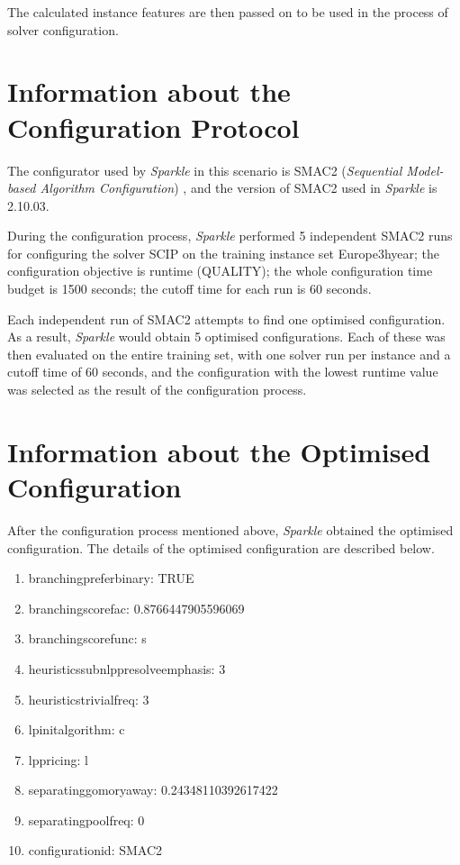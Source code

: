 \documentclass[british]{article}
\newif\iffeatures
\begin{document}
        The calculated instance features are then passed on to be used in the process of solver configuration. 

\fi


\section{Information about the Configuration Protocol}

The configurator used by \emph{Sparkle} in this scenario is SMAC2 ({\em Sequential Model-based Algorithm Configuration}) \cite{SMAC2}, and the version of SMAC2 used in \emph{Sparkle} is 2.10.03.

During the configuration process, \emph{Sparkle} performed 5 independent SMAC2 runs for configuring the solver SCIP on the training instance set Europe\textunderscore 3h\textunderscore year\iffeatures; the instance features of the training instance set were used for configuration\fi; the configuration objective is runtime (QUALITY); the whole configuration time budget is 1500 seconds; the cutoff time for each run is 60 seconds.

Each independent run of SMAC2 attempts to find one optimised configuration. As a result, \emph{Sparkle} would obtain 5 optimised configurations. Each of these was then evaluated on the entire training set, with one solver run per instance and a cutoff time of 60 seconds, and the configuration with the lowest runtime value was selected as the result of the configuration process.

\section{Information about the Optimised Configuration}

After the configuration process mentioned above, \emph{Sparkle} obtained the optimised configuration. The details of the optimised configuration are described below.

\vspace{5mm}

\begin{enumerate}
\item branching\textunderscore preferbinary: TRUE
\item branching\textunderscore scorefac: 0.8766447905596069
\item branching\textunderscore scorefunc: s
\item heuristics\textunderscore subnlp\textunderscore presolveemphasis: 3
\item heuristics\textunderscore trivial\textunderscore freq: 3
\item lp\textunderscore initalgorithm: c
\item lp\textunderscore pricing: l
\item separating\textunderscore gomory\textunderscore away: 0.24348110392617422
\item separating\textunderscore poolfreq: 0
\item configuration\textunderscore id: SMAC2

\end{enumerate}
\end{document}
